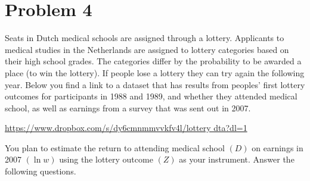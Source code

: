 \documentclass{article}
\begin{document}
\newpage
\section*{Problem 4}
Seats in Dutch medical schools are assigned through a lottery. Applicants to medical studies in the Netherlands are assigned to lottery categories based on their high school grades. The categories differ by the probability to be awarded a place (to win the lottery). If people lose a lottery they can try again the following year. Below you find a link to a dataset that has results from peoples' first lottery outcomes for participants in 1988 and 1989, and whether they attended medical school, as well as earnings from a survey that was sent out in 2007.

\begin{center}
    \url{https://www.dropbox.com/s/dy6cmnmmvvkfv4l/lottery dta?dl=1}    
\end{center}

You plan to estimate the return to attending medical school $(D)$ on earnings in 2007 $(\ln w)$ using the lottery outcome $(Z)$ as your instrument. Answer the following questions.
\end{document}

